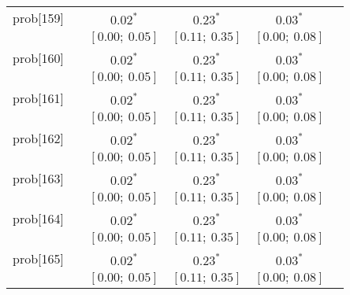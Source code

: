 \begin{table}
\begin{center}
\begin{tabular}{l c c c c c }
prob[159]   &                                  & $0.02^{*}$                & $0.23^{*}$                & $0.03^{*}$              &                         \\
            &                                  & $[0.00;\ 0.05]$           & $[0.11;\ 0.35]$           & $[0.00;\ 0.08]$         &                         \\
prob[160]   &                                  & $0.02^{*}$                & $0.23^{*}$                & $0.03^{*}$              &                         \\
            &                                  & $[0.00;\ 0.05]$           & $[0.11;\ 0.35]$           & $[0.00;\ 0.08]$         &                         \\
prob[161]   &                                  & $0.02^{*}$                & $0.23^{*}$                & $0.03^{*}$              &                         \\
            &                                  & $[0.00;\ 0.05]$           & $[0.11;\ 0.35]$           & $[0.00;\ 0.08]$         &                         \\
prob[162]   &                                  & $0.02^{*}$                & $0.23^{*}$                & $0.03^{*}$              &                         \\
            &                                  & $[0.00;\ 0.05]$           & $[0.11;\ 0.35]$           & $[0.00;\ 0.08]$         &                         \\
prob[163]   &                                  & $0.02^{*}$                & $0.23^{*}$                & $0.03^{*}$              &                         \\
            &                                  & $[0.00;\ 0.05]$           & $[0.11;\ 0.35]$           & $[0.00;\ 0.08]$         &                         \\
prob[164]   &                                  & $0.02^{*}$                & $0.23^{*}$                & $0.03^{*}$              &                         \\
            &                                  & $[0.00;\ 0.05]$           & $[0.11;\ 0.35]$           & $[0.00;\ 0.08]$         &                         \\
prob[165]   &                                  & $0.02^{*}$                & $0.23^{*}$                & $0.03^{*}$              &                         \\
            &                                  & $[0.00;\ 0.05]$           & $[0.11;\ 0.35]$           & $[0.00;\ 0.08]$         &                         \\

\end{tabular}
\end{center}
\end{table}
